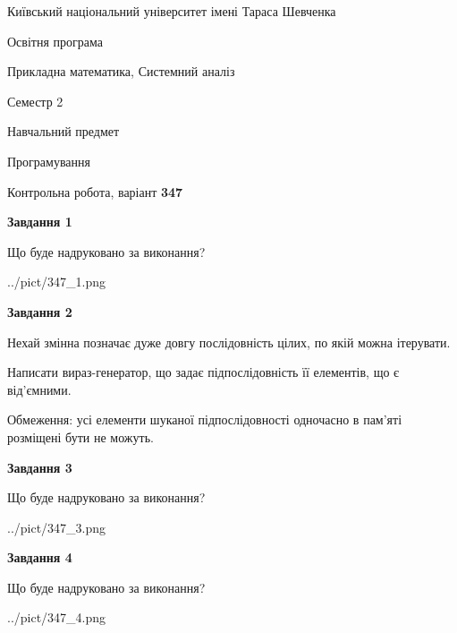 \documentclass[12pt, ukrainian]{article}
\begin{document}
{{\begin {small}\par
{ \center  Київський національний університет імені Тараса Шевченка \par}
{\parbox {5 cm}{Освітня програма \hfill}{\parbox {8 cm}{Прикладна математика, Системний аналіз \hfill}}\parbox {5 cm}{\hfill Семестр 2}}\par
{\parbox {5 cm} {Навчальний предмет \hfill}\parbox {7 cm}{Програмування \hfill}\parbox {6cm}{\hfill}\par}\vspace{-7pt} \end{small}}{\center Контрольна робота, варіант  \No \textbf
{ 347 }\par}}
{
\begin {large}
{\begin {center}\textbf{Завдання 1}\end {center}}\par
Що буде надруковано за виконання?\par\par
\begin{center}
	{../pict/347_1.png}
\end{center}
\newpage

{\begin {center}\textbf{Завдання 2}\end {center}}\par
Нехай змінна  позначає дуже довгу послідовність цілих, по якій можна ітерувати.

Написати вираз-генератор, що задає підпослідовність її елементів, що є від'єм\-ни\-ми.

Обмеження: усі елементи шуканої підпослідовності одночасно в пам'яті розміщені бути не можуть.\par
\newpage

{\begin {center}\textbf{Завдання 3}\end {center}}\par
Що буде надруковано за виконання?\par
\begin{center}
	{../pict/347_3.png}
\end{center}
\newpage

{\begin {center}\textbf{Завдання 4}\end {center}}\par
Що буде надруковано за виконання?\par
\begin{center}
	{../pict/347_4.png}
\end{center}
\newpage


\end{large}}
\end{document}
